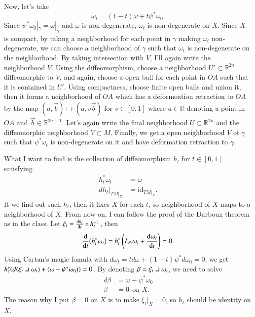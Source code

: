 \documentclass[a4paper, 12pt]{article}
\theoremstyle{Mydefinition}
\theoremstyle{Mytheorem}
\newcommand{\intprodl}{%
    \mathbin{\scalebox{1.5}{$\lrcorner$}}%
}
\begin{document}
\begin{enumerate}
    Now, let's take
    \begin{equation*}
        \omega_t = (1-t)\omega +t\psi^*\omega_0.
    \end{equation*}
    Since $\psi^*\omega_0|_\gamma = \omega|_\gamma$ and $\omega$ is-non-degenerate, $\omega_t$ is non-degenerate on $X$. Since $X$ is compact, by taking a neighborhood for each point in $\gamma$ making $\omega_t$ non-degenerate, we can choose a neighborhood of $\gamma$ such that $\omega_t$ is non-degenerate on the neighborhood. By taking intersection with $V$, I'll again write the neighborhood $V$. Using the diffeomorphism, choose a neighborhood $U'\subset \mathbb{R}^{2n}$ diffeomorphic to $V$, and again, choose a open ball for each point in $OA$ such that it is contained in $U'$. Using compactness, choose finite open balls and union it, then it forms a neighborhood of $OA$ which has a deformoation retraction to $OA$ by the map $(a,\vec{b})\mapsto (a,v\vec{b})$ for $v\in [0,1]$ where $a\in\mathbb{R}$ denoting a point in $OA$ and $\vec{b}\in \mathbb{R}^{2n-1}$. Let's again write the final neighborhood $U\subset\mathbb{R}^{2n}$ and the diffeomorphic neighborhood $V\subset M$. Finally, we get a open neighborhood $V$ of $\gamma$ such that $\psi^*\omega_t$ is non-degenerate on it and have deformation retraction to $\gamma$.
    
    What I want to find is the collection of diffeomorphism $h_t$ for $t\in[0,1]$ satisfying
    \begin{equation*}
        \begin{split}
            h_t^*\omega_t&=\omega\\
            dh_t|_{TM|_X} &= \mathrm{id}_{TM|_X}.
        \end{split}
    \end{equation*}
    It we find out such $h_t$, then it fixes $X$ for each $t$, so neighborhood of $X$ maps to a neighborhood of $X$. From now on, I can follow the proof of the Darboux theorem as in the class. Let $\xi_t = \dv{h_t}{t}\circ h_t^{-1}$, then 
    \begin{equation*}
        \dv{t}(h_t^*\omega_t) = h_t^*\left(L_{\xi_t}\omega_t + \dv{\omega_t}{t}\right) = 0.
    \end{equation*}
    Using Cartan's magic fomula with $d\omega_t = td\omega + (1-t)\psi^*d\omega_0 = 0$, we get $h_t^*(d(\xi_t\intprodl \omega_t) + (\omega - \psi^*\omega_0)) = 0$. By denoting $\beta = \xi_t\intprodl \omega_t$, we need to solve 
    \begin{equation}\label{HW8:Eq2}
        \begin{split}
            d\beta &= \omega - \psi^*\omega_0\\
            \beta &= 0~~\textrm{on }X.
        \end{split}
    \end{equation}
    The reason why I put $\beta = 0$ on $X$ is to make $\xi_t|_{X} = 0$, so $h_t$ should be identity on $X$.
    

\end{enumerate}
\end{document}
